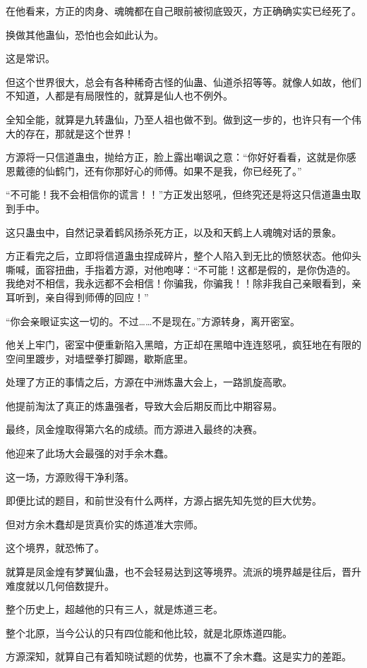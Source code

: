 \begin{this_body}
在他看来，方正的肉身、魂魄都在自己眼前被彻底毁灭，方正确确实实已经死了。

换做其他蛊仙，恐怕也会如此认为。

这是常识。

但这个世界很大，总会有各种稀奇古怪的仙蛊、仙道杀招等等。就像人如故，他们不知道，人都是有局限性的，就算是仙人也不例外。

全知全能，就算是九转蛊仙，乃至人祖也做不到。做到这一步的，也许只有一个伟大的存在，那就是这个世界！

方源将一只信道蛊虫，抛给方正，脸上露出嘲讽之意：“你好好看看，这就是你感恩戴德的仙鹤门，还有你那好心的师傅。如果不是我，你已经死了。”

“不可能！我不会相信你的谎言！！”方正发出怒吼，但终究还是将这只信道蛊虫取到手中。

这只蛊虫中，自然记录着鹤风扬杀死方正，以及和天鹤上人魂魄对话的景象。

方正看完之后，立即将信道蛊虫捏成碎片，整个人陷入到无比的愤怒状态。他仰头嘶喊，面容扭曲，手指着方源，对他咆哮：“不可能！这都是假的，是你伪造的。我绝对不相信，我永远都不会相信！你骗我，你骗我！！除非我自己亲眼看到，亲耳听到，亲自得到师傅的回应！”

“你会亲眼证实这一切的。不过……不是现在。”方源转身，离开密室。

他关上牢门，密室中便重新陷入黑暗，方正却在黑暗中连连怒吼，疯狂地在有限的空间里踱步，对墙壁拳打脚踢，歇斯底里。

处理了方正的事情之后，方源在中洲炼蛊大会上，一路凯旋高歌。

他提前淘汰了真正的炼蛊强者，导致大会后期反而比中期容易。

最终，凤金煌取得第六名的成绩。而方源进入最终的决赛。

他迎来了此场大会最强的对手余木蠢。

这一场，方源败得干净利落。

即便比试的题目，和前世没有什么两样，方源占据先知先觉的巨大优势。

但对方余木蠢却是货真价实的炼道准大宗师。

这个境界，就恐怖了。

就算是凤金煌有梦翼仙蛊，也不会轻易达到这等境界。流派的境界越是往后，晋升难度就以几何倍数提升。

整个历史上，超越他的只有三人，就是炼道三老。

整个北原，当今公认的只有四位能和他比较，就是北原炼道四能。

方源深知，就算自己有着知晓试题的优势，也赢不了余木蠢。这是实力的差距。


\end{this_body}
